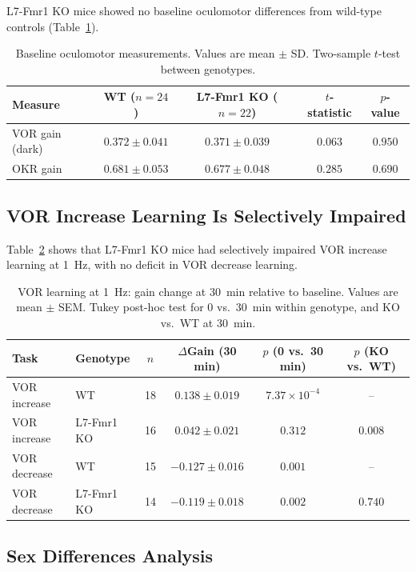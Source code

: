 \documentclass[11pt]{article}
\begin{document}
L7-Fmr1 KO mice showed no baseline oculomotor differences from wild-type controls (Table~\ref{tab:baseline}).

\begin{table}[H]
\centering
\caption{Baseline oculomotor measurements. Values are mean $\pm$ SD. Two-sample $t$-test between genotypes.}
\label{tab:baseline}
\begin{tabular}{lcccc}
\toprule
Measure & WT ($n = 24$) & L7-Fmr1 KO ($n = 22$) & $t$-statistic & $p$-value \\
\midrule
VOR gain (dark) & $0.372 \pm 0.041$ & $0.371 \pm 0.039$ & $0.063$ & $0.950$ \\
OKR gain & $0.681 \pm 0.053$ & $0.677 \pm 0.048$ & $0.285$ & $0.690$ \\
\bottomrule
\end{tabular}
\end{table}

\subsection{VOR Increase Learning Is Selectively Impaired}

Table~\ref{tab:vor_learning} shows that L7-Fmr1 KO mice had selectively impaired VOR increase learning at 1~Hz, with no deficit in VOR decrease learning.

\begin{table}[H]
\centering
\caption{VOR learning at 1~Hz: gain change at 30~min relative to baseline. Values are mean $\pm$ SEM. Tukey post-hoc test for 0 vs.\ 30~min within genotype, and KO vs.\ WT at 30~min.}
\label{tab:vor_learning}
\begin{tabular}{llcccc}
\toprule
Task & Genotype & $n$ & $\Delta$Gain (30 min) & $p$ (0 vs.\ 30 min) & $p$ (KO vs.\ WT) \\
\midrule
VOR increase & WT & 18 & $0.138 \pm 0.019$ & $7.37 \times 10^{-4}$ & -- \\
VOR increase & L7-Fmr1 KO & 16 & $0.042 \pm 0.021$ & $0.312$ & $0.008$ \\
VOR decrease & WT & 15 & $-0.127 \pm 0.016$ & $0.001$ & -- \\
VOR decrease & L7-Fmr1 KO & 14 & $-0.119 \pm 0.018$ & $0.002$ & $0.740$ \\
\bottomrule
\end{tabular}
\end{table}

\subsection{Sex Differences Analysis}
\end{document}
